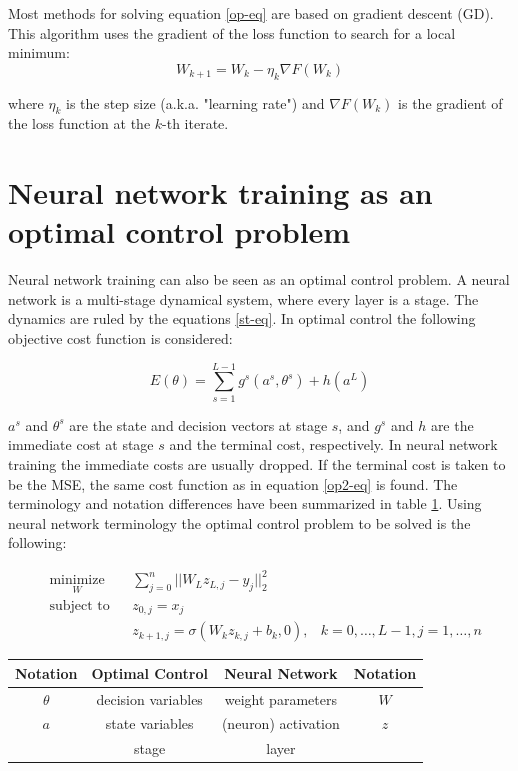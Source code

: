 Most methods for solving equation \ref{op-eq} are based on gradient descent (GD). This algorithm uses the gradient of the loss function to search for a local minimum:
\begin{equation}
W_{k+1} = W_{k} - \eta_k\nabla F(W_k)
\label{gd-eq}
\end{equation}

where $\eta_k$ is the step size (a.k.a. "learning rate") and $\nabla F(W_k)$ is the gradient of the loss function at the $k$-th iterate.

\section{Neural network training as an optimal control problem}
Neural network training can also be seen as an optimal control problem. A neural network is a multi-stage dynamical system, where every layer is a stage. The dynamics are ruled by the equations \ref{st-eq}. In optimal control the following objective cost function is considered:

\begin{equation}
E(\theta) = \sum\limits_{s=1}^{L-1}g^s(a^s,\theta^s) + h(a^L)
\end{equation}


$a^s$ and $\theta^s$ are the state and decision vectors at stage $s$, and $g^s$ and $h$ are the immediate cost at stage $s$ and the terminal cost, respectively. In neural network training the immediate costs are usually dropped. If the terminal cost is taken to be the MSE, the same cost function as in equation \ref{op2-eq} is found. The terminology and notation differences have been summarized in table \ref{trans-tbl}. Using neural network terminology the optimal control problem to be solved is the following:

\begin{equation}
	\begin{aligned}
	& \underset{W}{\text{minimize}}
	& & \sum\limits_{j=0}^{n}||W_Lz_{L,j} - y_j||^2_2 \\
	& \text{subject to}
	& & z_{0,j} = x_j \\
	& & & z_{k+1,j} = \sigma(W_kz_{k,j} + b_k,0), &k = 0,\ldots,L-1,j = 1,\ldots,n
	\end{aligned}
	\label{ocp-eq}
\end{equation}


\begin{table}
\centering
\begin{tabular}{c | c | c | c}
Notation & Optimal Control & Neural Network & Notation\\ \hline
$\theta$ & decision variables & weight parameters & $W$\\
$a$ & state variables & (neuron) activation & $z$\\
& stage & layer \\
\end{tabular}
\label{trans-tbl}
\end{table}


